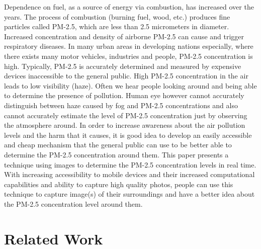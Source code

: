 \documentclass{article}
\begin{document}
Dependence on fuel, as a source of energy via combustion, has increased over the years. The process of combustion (burning fuel, wood, etc.) produces fine particles called PM-2.5, which are less than 2.5 micrometers in diameter. Increased concentration and density of airborne PM-2.5 can cause and trigger respiratory diseases. In many urban areas in developing nations especially, where there exists many motor vehicles, industries and people, PM-2.5 concentration is high. Typically, PM-2.5 is accurately determined and measured by expensive devices inaccessible to the general public. High PM-2.5 concentration in the air leads to low visibility (haze). Often we hear people looking around and being able to determine the presence of pollution. Human eye however cannot accurately distinguish between haze caused by fog and PM-2.5 concentrations  and also cannot accurately estimate the level of  PM-2.5 concentration just by observing the atmosphere around. In order to increase awareness about the air pollution levels and the harm that it causes, it is good idea to develop an easily accessible and cheap mechanism that the general public can use to be better able to determine the PM-2.5 concentration around them. This paper presents a technique using images to determine the PM-2.5 concentration levels in real time. With increasing accessibility to mobile devices and their increased computational capabilities and ability to capture high quality photos, people can use this technique to capture image(s) of their surroundings and have a better idea about the PM-2.5 concentration level around them.

\section{Related Work}
\label{sec:related work}
\end{document}
